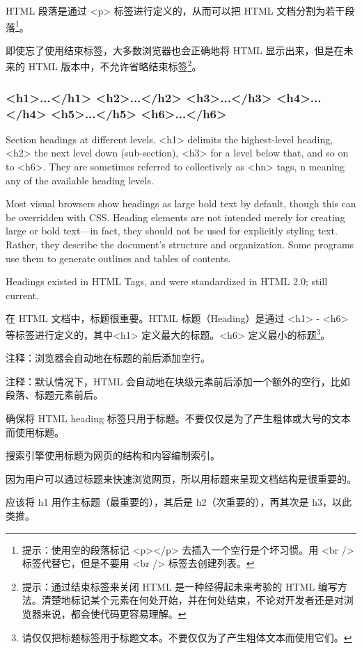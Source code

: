 HTML 段落是通过 <p> 标签进行定义的，从而可以把 HTML 文档分割为若干段落\footnote{提示：使用空的段落标记 <p></p> 去插入一个空行是个坏习惯。用 <br /> 标签代替它，但是不要用 <br /> 标签去创建列表。}。





即使忘了使用结束标签，大多数浏览器也会正确地将 HTML 显示出来，但是在未来的 HTML 版本中，不允许省略结束标签\footnote{提示：通过结束标签来关闭 HTML 是一种经得起未来考验的 HTML 编写方法。清楚地标记某个元素在何处开始，并在何处结束，不论对开发者还是对浏览器来说，都会使代码更容易理解。}。






\subsubsection{<h1>...</h1> <h2>...</h2> <h3>...</h3> <h4>...</h4> <h5>...</h5> <h6>...</h6>}

Section headings at different levels. <h1> delimits the highest-level heading, <h2> the next level down (sub-section), <h3> for a level below that, and so on to <h6>. They are sometimes referred to collectively as <hn> tags, n meaning any of the available heading levels.

Most visual browsers show headings as large bold text by default, though this can be overridden with CSS. Heading elements are not intended merely for creating large or bold text—in fact, they should not be used for explicitly styling text. Rather, they describe the document’s structure and organization. Some programs use them to generate outlines and tables of contents.

Headings existed in HTML Tags, and were standardized in HTML 2.0; still current.

在 HTML 文档中，标题很重要。HTML 标题（Heading）是通过 <h1> - <h6> 等标签进行定义的，其中<h1> 定义最大的标题。<h6> 定义最小的标题\footnote{请仅仅把标题标签用于标题文本。不要仅仅为了产生粗体文本而使用它们。}。

注释：浏览器会自动地在标题的前后添加空行。

注释：默认情况下，HTML 会自动地在块级元素前后添加一个额外的空行，比如段落、标题元素前后。

\begin{compactitem}
\item 确保将 HTML heading 标签只用于标题。不要仅仅是为了产生粗体或大号的文本而使用标题。
\item 搜索引擎使用标题为网页的结构和内容编制索引。
\item 因为用户可以通过标题来快速浏览网页，所以用标题来呈现文档结构是很重要的。
\item 应该将 h1 用作主标题（最重要的），其后是 h2（次重要的），再其次是 h3，以此类推。
\end{compactitem}

